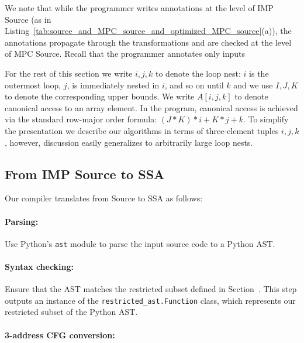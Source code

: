 We note that while the programmer writes
annotations at the level of IMP Source (as in Listing~\ref{tab:source_and_MPC_source_and_optimized_MPC_source}(a)), the
annotations propagate through the transformations and are checked at the 
level of MPC Source. Recall that the programmer annotates only inputs


For the rest of this section we write $i,j,k$ to denote the loop nest: $i$ is the outermost loop, $j$, is immediately nested in $i$, and so on until $k$
and we use $I,J,K$ to denote the corresponding upper bounds. We write $A[i,j,k]$ to denote canonical access
to an array element. In the program, canonical access is achieved via the standard row-major order formula: $(J*K)*i + K*j + k$.
To simplify the presentation we describe our algorithms in terms of three-element tuples $i,j,k$, however, discussion easily generalizes to
arbitrarily large loop nests.



\subsection{From IMP Source to SSA}
\label{sec:imp_to_ssa}


Our compiler translates from Source to SSA as follows:

        \paragraph{Parsing:}
        Use Python's \texttt{ast} module to parse the input source code to a Python AST.
        \paragraph{Syntax checking:}
        Ensure that the AST matches the restricted subset defined in Section~.
        This step outputs an instance of the \texttt{restricted\_ast.Function} class, which represents our restricted subset of the Python AST.
        \paragraph{3-address CFG conversion:}

